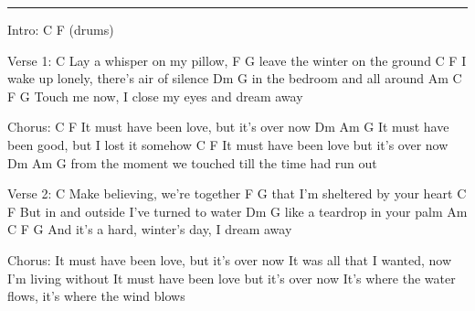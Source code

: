 \noindent\rule{\columnwidth}{1pt}
\begin{lstsong}
Intro: C F (drums)

Verse 1:
       C
Lay a whisper on my pillow,
          F             G
leave the winter on the ground
          C                       F
I wake up lonely, there's air of silence
       Dm               G
in the bedroom and all around
         Am              C              F     G
Touch me now, I close my eyes and dream away

Chorus:
                  C                   F
It must have been love, but it's over now
                  Dm          Am          G
It must have been good, but I lost it somehow
                  C                  F
It must have been love but it's over now
                   Dm               Am           G
from the moment we touched till the time had run out

Verse 2:
       C
Make believing, we're together
         F                 G
that I'm sheltered by your heart
           C                      F
But in and outside I've turned to water
       Dm               G
like a teardrop in your palm
           Am             C            F    G
And it's a hard, winter's day, I dream away

Chorus:
It must have been love, but it's over now
It was all that I wanted, now I'm living without
It must have been love but it's over now
It's where the water flows, it's where the wind blows
\end{lstsong}
\newpage

\begin{comment}
Chorus:
                   C                  F
It must have been love, but it's over now
                  Dm              Am         G
It was all that I wanted, now I'm living without
                   C                 Gm
It must have been love but it's over now
               C                           Bb
It's where the water flows, it's where the wind blows

Interlude: Dm C Bb Dm F C Bb Dm

Chorus:
                  F                  Bb
It must have been love but it's over now
                  Gm          Dm         C
It must have been good, but I lost it somehow
                   F                  Bb
It must have been love, but it's over now,
                   Gm               Dm            C
from the moment we touched till the time had run out.
                        F                 Bb
Yeah it must have been love but it's over now
              Gm               Dm        C
It was all I wanted, now I'm living without
                   F                Cm
It must have been love but it's over now
               F                           Eb
It's where the water flows, it's where the wind blows
                  F                  Bb

It must have been love but it's over now
\end{comment}
